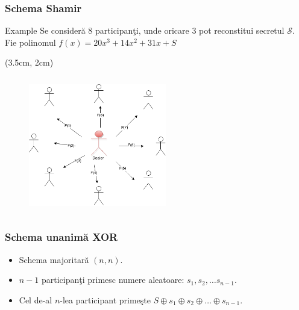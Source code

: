 \documentclass{beamer}
\begin{document}
\begin{frame}
    \frametitle{Schema Shamir}
     {
        \begin{exampleblock}{Example}
           Se consider\u{a} 8 participan\c{t}i, unde oricare $3$ pot reconstitui secretul $\mathcal{S}$. Fie polinomul $f(x) = 20x ^ 3 + 14x ^ 2 + 31x + S$
        \end{exampleblock}
    }
     {
     \begin{textblock*}{4cm}(3.5cm, 2cm)
        \begin{figure}
            \includegraphics[width=6cm,height=6cm,keepaspectratio]{img/shamir/example.png}
       \end{figure}
        \end{textblock*}
 
    }
\end{frame}

\begin{frame}
    \frametitle{Schema unanim\u{a} XOR}
    \begin{itemize}
        \item Schema majoritar\u{a} $(n,n)$.
        \pause
        \item $n-1$ participan\c{t}i primesc numere aleatoare: $s_1, s_2, \dots s_{n-1}$.
        \pause
        \item Cel de-al $n$-lea participant prime\c{s}te $S \oplus s_1 \oplus s_2 \oplus \dots \oplus s_{n-1}$.
    \end{itemize}
\end{frame}
\end{document}
